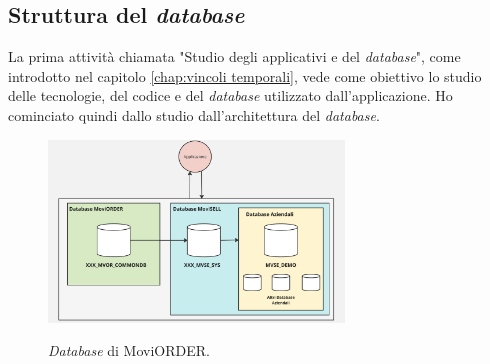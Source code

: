 \subsection{Struttura del \textit{database}}
La prima attività chiamata "Studio degli applicativi e del \textit{database}", come introdotto nel capitolo \ref{chap:vincoli temporali}, 
vede come obiettivo lo studio delle tecnologie, del codice e del \textit{database} utilizzato dall'applicazione. Ho cominciato quindi 
dallo studio dall'architettura del \textit{database}.\\

\begin{figure}[H]
    \centering
    \includegraphics[alt={\textit{Database} di MoviORDER}, width=0.7\textwidth]{img/database.png}
    \caption {\textit{Database} di MoviORDER.}
    \label{fig:database}
\end{figure}

